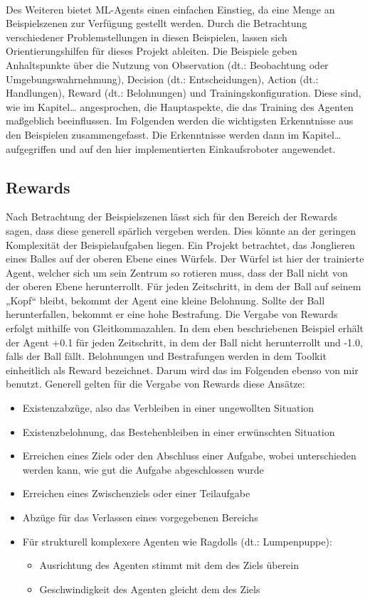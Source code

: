 \\
Des Weiteren bietet ML-Agents einen einfachen Einstieg, da eine Menge an Beispielszenen zur Verfügung gestellt werden. Durch die Betrachtung verschiedener Problemstellungen in diesen Beispielen, lassen sich Orientierungshilfen für dieses Projekt ableiten. Die Beispiele geben Anhaltspunkte über die Nutzung von Observation (dt.: Beobachtung oder Umgebungswahrnehmung), Decision (dt.: Entscheidungen), Action (dt.: Handlungen), Reward (dt.: Belohnungen) und Trainingskonfiguration. Diese sind, wie im Kapitel… angesprochen, die Hauptaspekte, die das Training des Agenten maßgeblich beeinflussen. Im Folgenden werden die wichtigsten Erkenntnisse aus den Beispielen zusammengefasst. Die Erkenntnisse werden dann im Kapitel… aufgegriffen und auf den hier implementierten Einkaufsroboter angewendet. 

\subsection{Rewards}
\label{rewards}
Nach Betrachtung der Beispielszenen lässt sich für den Bereich der Rewards sagen, dass diese generell spärlich vergeben werden. Dies könnte an der geringen Komplexität der Beispielaufgaben liegen. Ein Projekt betrachtet, das Jonglieren eines Balles auf der oberen Ebene eines Würfels. Der Würfel ist hier der trainierte Agent, welcher sich um sein Zentrum so rotieren muss, dass der Ball nicht von der oberen Ebene herunterrollt. Für jeden Zeitschritt, in dem der Ball auf seinem „Kopf“ bleibt, bekommt der Agent eine kleine Belohnung. Sollte der Ball herunterfallen, bekommt er eine hohe Bestrafung. Die Vergabe von Rewards erfolgt mithilfe von Gleitkommazahlen. In dem eben beschriebenen Beispiel erhält der Agent +0.1 für jeden Zeitschritt, in dem der Ball nicht herunterrollt und -1.0, falls der Ball fällt. Belohnungen und Bestrafungen werden in dem Toolkit einheitlich als Reward bezeichnet. Darum wird das im Folgenden ebenso von mir benutzt. Generell gelten für die Vergabe von Rewards diese Ansätze:
\\
\begin{itemize}
	\item Existenzabzüge, also das Verbleiben in einer ungewollten Situation 
	\item Existenzbelohnung, das Bestehenbleiben in einer erwünschten Situation
	\item Erreichen eines Ziels oder den Abschluss einer Aufgabe, wobei unterschieden werden kann, wie gut die Aufgabe abgeschlossen wurde
	\item Erreichen eines Zwischenziels oder einer Teilaufgabe
	\item Abzüge für das Verlassen eines vorgegebenen Bereichs
	\item Für strukturell komplexere Agenten wie Ragdolls (dt.: Lumpenpuppe):
	\begin{itemize}
		\item Ausrichtung des Agenten stimmt mit dem des Ziels überein
		\item Geschwindigkeit des Agenten gleicht dem des Ziels
	\end{itemize} 	 
\end{itemize}

